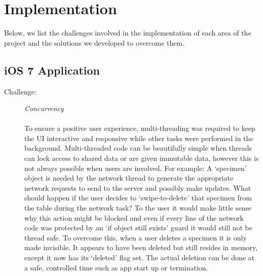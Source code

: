 \documentclass[a4paper,11pt]{article}
\begin{document}
\clearpage


\section{Implementation}

Below, we list the challenges involved in the implementation of each area of the project and the solutions we developed to overcome them.

\subsection{iOS 7 Application}
\begin{description}

\item [Challenge:] \textit{Concurrency}\\\\
To ensure a positive user experience, multi-threading was required to keep the UI interactive and responsive while other tasks were performed in the background. Multi-threaded code can be beautifully simple when threads can lock access to shared data or are given immutable data, however this is not always possible when users are involved. For example: A `specimen' object is needed by the network thread to generate the appropriate network requests to send to the server and possibly make updates. What should happen if the user decides to `swipe-to-delete' that specimen from the table during the network task? To the user it would make little sense why this action might be blocked and even if every line of the network code was protected by an `if object still exists' guard it would still not be thread safe. To overcome this, when a user deletes a specimen it is only made invisible. It appears to have been deleted but still resides in memory, except it now has its `deleted' flag set. The actual deletion can be done at a safe, controlled time such as app start up or termination.\\



\end{description}
\end{document}
